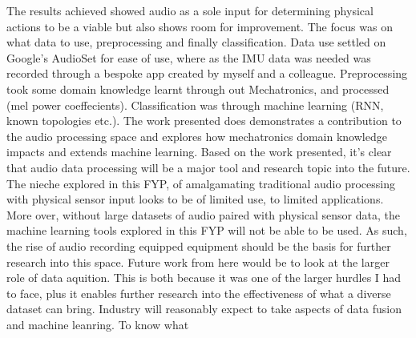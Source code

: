 \documentclass{UoNMCHA}
\numberwithin{equation}{section}
\begin{document}
The results achieved showed audio as a sole input for determining physical actions to be a viable but also shows room for improvement. The focus was on what data to use, preprocessing and finally classification. 
Data use settled on Google's AudioSet for ease of use, where as the IMU data was needed was recorded through a bespoke app created by myself and a colleague. Preprocessing took some domain knowledge learnt through out Mechatronics, and processed (mel power coeffecients). Classification was through machine learning (RNN, known topologies etc.). 
The work presented does demonstrates a contribution to the audio processing space and explores how mechatronics domain knowledge impacts and extends machine learning.
Based on the work presented, it's clear that audio data processing will be a major tool and research topic into the future. The nieche explored in this FYP, of amalgamating traditional audio processing with physical sensor input looks to be of limited use, to limited applications. More over, without large datasets of audio paired with physical sensor data, the machine learning tools explored in this FYP will not be able to be used. As such, the rise of audio recording equipped equipment should be the basis for further research into this space. 
Future work from here would be to look at the larger role of data aquition. This is both because it was one of the larger hurdles I had to face, plus it enables further research into the effectiveness of what a diverse dataset can bring. Industry will reasonably expect to take aspects of data fusion and machine leanring. To know what
\end{document}
